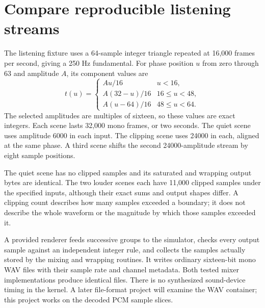 \section{Compare reproducible listening streams}\label{pcm-listening}
The listening fixture uses a 64-sample integer triangle repeated at 16,000 frames
per second, giving a 250 Hz fundamental. For phase position $u$ from zero through
63 and amplitude $A$, its component values are
\[
  t(u)=\begin{cases}
    Au/16      & u<16,        \\
    A(32-u)/16 & 16\leq u<48, \\
    A(u-64)/16 & 48\leq u<64.
  \end{cases}
\]
The selected amplitudes are multiples of sixteen, so these values are exact integers.
Each scene lasts 32,000 mono frames, or two seconds. The quiet scene uses amplitude
6000 in each input. The clipping scene uses 24000 in each, aligned at the same phase.
A third scene shifts the second 24000-amplitude stream by eight sample positions.

The quiet scene has no clipped samples and its saturated and wrapping output bytes
are identical. The two louder scenes each have 11,000 clipped samples under the
specified inputs, although their exact sums and output shapes differ. A clipping
count describes how many samples exceeded a boundary; it does not describe the
whole waveform or the magnitude by which those samples exceeded it.

A provided renderer feeds successive groups to the simulator, checks every output
sample against an independent integer rule, and collects the samples actually stored
by the mixing and wrapping routines. It writes ordinary sixteen-bit mono WAV files
with their sample rate and channel metadata. Both tested mixer implementations
produce identical files. There is no synthesized sound-device timing in the kernel.
A later file-format project will examine the WAV container; this project works on
the decoded PCM sample slices.

